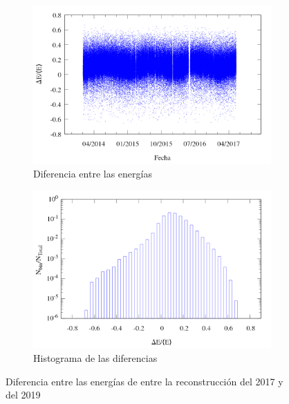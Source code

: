         \begin{figure}[H]
          \centering
            \begin{subfigure}[b]{0.5\textwidth}
              \centering
              \includegraphics[width=\linewidth]{deltaE_tiempo_v2_rango_1_2.png}
              \caption{Diferencia entre las energías} \label{fig:deltaE}
            \end{subfigure}%
            \begin{subfigure}[b]{0.5\textwidth}
              \centering
              \includegraphics[width=\linewidth]{histograma_deltaE_v3_rango_1_2.png}
              \caption{Histograma de las diferencias}   \label{fig:histograma}
            \end{subfigure}
           \caption{Diferencia entre las energías de entre la reconstrucción del 2017 y del 2019}
         \end{figure}
	
